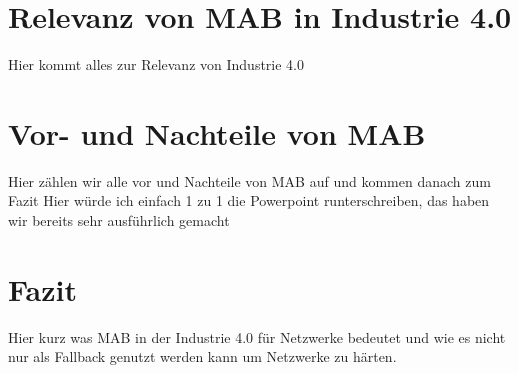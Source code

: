 \documentclass[conference]{IEEEtran}
\begin{document}
\section{Relevanz von MAB in Industrie 4.0}
Hier kommt alles zur Relevanz von Industrie 4.0

\section{Vor- und Nachteile von MAB}
Hier zählen wir alle vor und Nachteile von MAB auf und kommen danach zum Fazit
Hier würde ich einfach 1 zu 1 die Powerpoint runterschreiben, das haben wir bereits sehr ausführlich gemacht

\section{Fazit}
Hier kurz was MAB in der Industrie 4.0 für Netzwerke bedeutet und wie es nicht nur als Fallback genutzt werden kann um Netzwerke zu härten.




\end{document}
